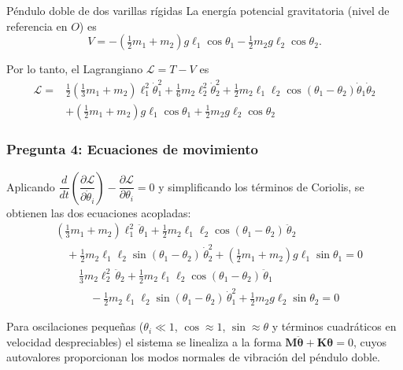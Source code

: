 \begin{solucion}{Péndulo doble de dos varillas rígidas}
La energía potencial gravitatoria (nivel de referencia en $O$) es
$$V = -\left(\tfrac12 m_1 + m_2\right)g\ell_1\cos\theta_1 - \tfrac12 m_2 g\ell_2\cos\theta_2.$$

Por lo tanto, el Lagrangiano $\mathcal{L}=T-V$ es
$$\boxed{\begin{aligned}
\mathcal{L} ={}& \tfrac12\left(\tfrac13 m_1 + m_2\right)\ell_1^2\dot\theta_1^2
+ \tfrac16 m_2\ell_2^2\dot\theta_2^2
+ \tfrac12 m_2\ell_1\ell_2\cos(\theta_1-\theta_2)\dot\theta_1\dot\theta_2 \\
&+ \left(\tfrac12 m_1 + m_2\right)g\ell_1\cos\theta_1 + \tfrac12 m_2 g\ell_2\cos\theta_2
\end{aligned}}$$

\subsubsection*{Pregunta 4: Ecuaciones de movimiento}

Aplicando $\dfrac{d}{dt}\!\left(\dfrac{\partial\mathcal{L}}{\partial\dot\theta_i}\right)
-\dfrac{\partial\mathcal{L}}{\partial\theta_i}=0$ y simplificando los términos de
Coriolis, se obtienen las dos ecuaciones acopladas:
$$\boxed{\begin{aligned}
&\left(\tfrac13 m_1 + m_2\right)\ell_1^2\,\ddot\theta_1
+ \tfrac12 m_2\ell_1\ell_2\cos(\theta_1-\theta_2)\,\ddot\theta_2 \\
&\quad + \tfrac12 m_2\ell_1\ell_2\sin(\theta_1-\theta_2)\,\dot\theta_2^2
+ \left(\tfrac12 m_1 + m_2\right)g\ell_1\sin\theta_1 = 0
\end{aligned}}$$
$$\boxed{\begin{aligned}
&\tfrac13 m_2\ell_2^2\,\ddot\theta_2
+ \tfrac12 m_2\ell_1\ell_2\cos(\theta_1-\theta_2)\,\ddot\theta_1 \\
&\quad - \tfrac12 m_2\ell_1\ell_2\sin(\theta_1-\theta_2)\,\dot\theta_1^2
+ \tfrac12 m_2 g\ell_2\sin\theta_2 = 0
\end{aligned}}$$

Para oscilaciones pequeñas ($\theta_i\ll1$, $\cos\approx1$, $\sin\approx\theta$ y términos
cuadráticos en velocidad despreciables) el sistema se linealiza a la forma
$\mathbf{M}\ddot{\boldsymbol\theta}+\mathbf{K}\boldsymbol\theta=0$, cuyos autovalores
proporcionan los modos normales de vibración del péndulo doble.
\end{solucion}
